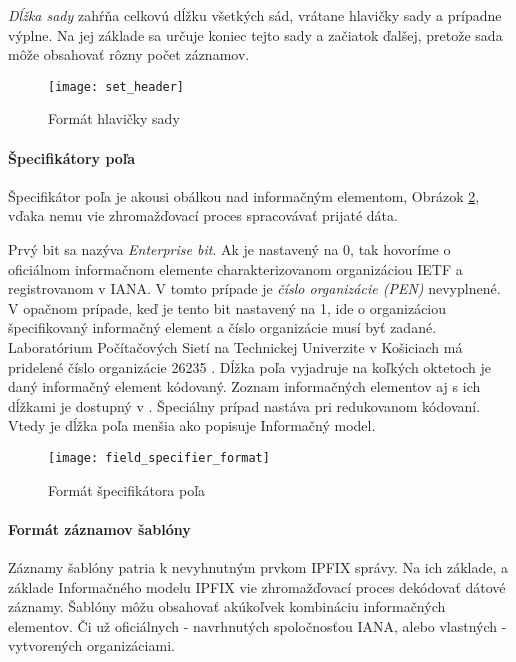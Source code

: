 \emph{Dĺžka sady} zahŕňa celkovú dĺžku všetkých sád, vrátane hlavičky sady a prípadne výplne. Na jej základe 
sa určuje koniec tejto sady a začiatok ďalšej, pretože sada môže obsahovať rôzny počet záznamov.

\begin{figure}[ht!]
\centering
\texttt{[image: set\_header]}
\caption{Formát hlavičky sady}\label{o:set_header}
\end{figure}



\paragraph{Špecifikátory poľa}

Špecifikátor poľa je akousi obálkou nad informačným elementom, Obrázok \ref{o:field_specifier_format}, 
vďaka nemu vie zhromažďovací proces spracovávať prijaté dáta. 

Prvý bit sa nazýva \emph{Enterprise bit}.
Ak je nastavený na 0, tak hovoríme o oficiálnom informačnom elemente charakterizovanom organizáciou IETF a 
registrovanom v IANA. 
V tomto prípade je \emph{číslo organizácie (PEN)} nevyplnené. V opačnom prípade, 
keď je tento bit nastavený na 1, ide o organizáciou špecifikovaný informačný element a číslo organizácie
musí byť zadané. Laboratórium Počítačových Sietí na Technickej Univerzite v Košiciach má pridelené číslo 
organizácie 26235 \citep{pen}.
Dĺžka poľa vyjadruje na koľkých oktetoch je daný informačný element kódovaný. 
Zoznam informačných elementov aj s ich dĺžkami je dostupný v \citep{rfc5102}.
Špeciálny prípad nastáva pri redukovanom kódovaní. Vtedy je dĺžka poľa menšia ako popisuje 
Informačný model. 
 
\begin{figure}[ht!]
\centering
\texttt{[image: field\_specifier\_format]}
\caption{Formát špecifikátora poľa}\label{o:field_specifier_format}
\end{figure}



\paragraph{Formát záznamov šablóny}

Záznamy šablóny patria k nevyhnutným prvkom IPFIX správy. Na ich základe, a základe Informačného modelu
IPFIX \citep{rfc5102} vie zhromažďovací proces dekódovať dátové záznamy.
Šablóny môžu obsahovať akúkoľvek kombináciu informačných elementov. Či už oficiálnych - navrhnutých 
spoločnosťou IANA, alebo vlastných - vytvorených organizáciami.

